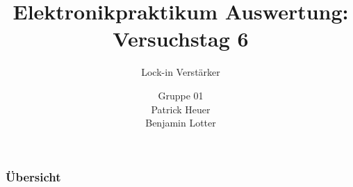 \documentclass{beamer}
\title{Elektronikpraktikum Auswertung: Versuchstag 6}
\subtitle{Lock-in Verstärker}
\author{Gruppe 01 \\ Patrick Heuer \\ Benjamin Lotter}
\date{}
\begin{document}
\maketitle
\begin{frame}
    \frametitle{Übersicht}
    \tableofcontents
\end{frame}




    
\end{document}
